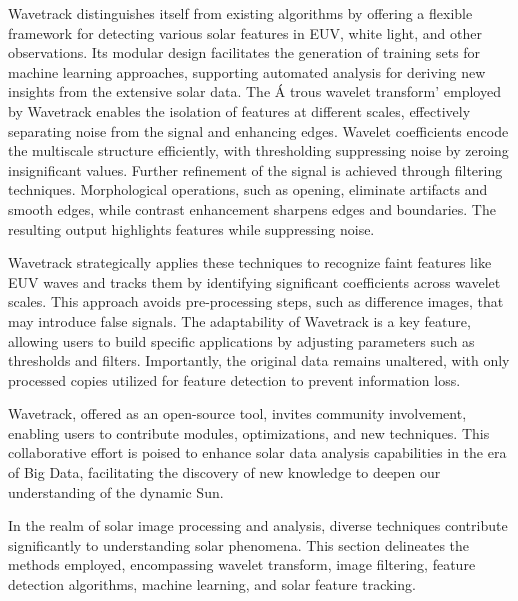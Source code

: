 Wavetrack distinguishes itself from existing algorithms by offering a flexible framework for detecting various solar features in EUV, white light, and other observations. Its modular design facilitates the generation of training sets for machine learning approaches, supporting automated analysis for deriving new insights from the extensive solar data. The \'A trous wavelet transform' employed by Wavetrack enables the isolation of features at different scales, effectively separating noise from the signal and enhancing edges. Wavelet coefficients encode the multiscale structure efficiently, with thresholding suppressing noise by zeroing insignificant values. Further refinement of the signal is achieved through filtering techniques. Morphological operations, such as opening, eliminate artifacts and smooth edges, while contrast enhancement sharpens edges and boundaries. The resulting output highlights features while suppressing noise.

Wavetrack strategically applies these techniques to recognize faint features like EUV waves and tracks them by identifying significant coefficients across wavelet scales. This approach avoids pre-processing steps, such as difference images, that may introduce false signals. The adaptability of Wavetrack is a key feature, allowing users to build specific applications by adjusting parameters such as thresholds and filters. Importantly, the original data remains unaltered, with only processed copies utilized for feature detection to prevent information loss.

Wavetrack, offered as an open-source tool, invites community involvement, enabling users to contribute modules, optimizations, and new techniques. This collaborative effort is poised to enhance solar data analysis capabilities in the era of Big Data, facilitating the discovery of new knowledge to deepen our understanding of the dynamic Sun.

In the realm of solar image processing and analysis, diverse techniques contribute significantly to understanding solar phenomena. This section delineates the methods employed, encompassing wavelet transform, image filtering, feature detection algorithms, machine learning, and solar feature tracking.


